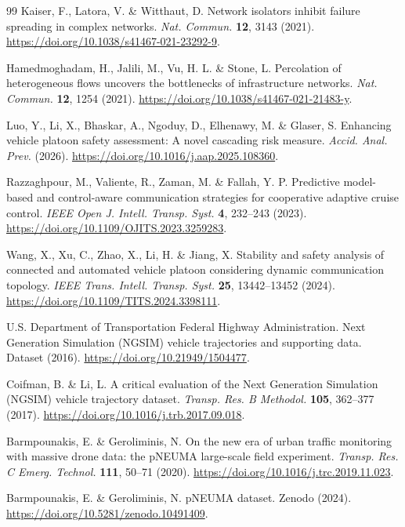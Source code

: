 \documentclass[10pt,a4paper,twocolumn]{article}
\begin{document}
\begin{thebibliography}{99}
Kaiser, F., Latora, V. \& Witthaut, D. Network isolators inhibit failure spreading in complex networks. \textit{Nat. Commun.} \textbf{12}, 3143 (2021). \url{https://doi.org/10.1038/s41467-021-23292-9}.

Hamedmoghadam, H., Jalili, M., Vu, H. L. \& Stone, L. Percolation of heterogeneous flows uncovers the bottlenecks of infrastructure networks. \textit{Nat. Commun.} \textbf{12}, 1254 (2021). \url{https://doi.org/10.1038/s41467-021-21483-y}.

Luo, Y., Li, X., Bhaskar, A., Ngoduy, D., Elhenawy, M. \& Glaser, S. Enhancing vehicle platoon safety assessment: A novel cascading risk measure. \textit{Accid. Anal. Prev.} (2026). \url{https://doi.org/10.1016/j.aap.2025.108360}.

Razzaghpour, M., Valiente, R., Zaman, M. \& Fallah, Y. P. Predictive model-based and control-aware communication strategies for cooperative adaptive cruise control. \textit{IEEE Open J. Intell. Transp. Syst.} \textbf{4}, 232--243 (2023). \url{https://doi.org/10.1109/OJITS.2023.3259283}.

Wang, X., Xu, C., Zhao, X., Li, H. \& Jiang, X. Stability and safety analysis of connected and automated vehicle platoon considering dynamic communication topology. \textit{IEEE Trans. Intell. Transp. Syst.} \textbf{25}, 13442--13452 (2024). \url{https://doi.org/10.1109/TITS.2024.3398111}.

U.S. Department of Transportation Federal Highway Administration. Next Generation Simulation (NGSIM) vehicle trajectories and supporting data. Dataset (2016). \url{https://doi.org/10.21949/1504477}.

Coifman, B. \& Li, L. A critical evaluation of the Next Generation Simulation (NGSIM) vehicle trajectory dataset. \textit{Transp. Res. B Methodol.} \textbf{105}, 362--377 (2017). \url{https://doi.org/10.1016/j.trb.2017.09.018}.

Barmpounakis, E. \& Geroliminis, N. On the new era of urban traffic monitoring with massive drone data: the pNEUMA large-scale field experiment. \textit{Transp. Res. C Emerg. Technol.} \textbf{111}, 50--71 (2020). \url{https://doi.org/10.1016/j.trc.2019.11.023}.

Barmpounakis, E. \& Geroliminis, N. pNEUMA dataset. Zenodo (2024). \url{https://doi.org/10.5281/zenodo.10491409}.


\end{thebibliography}
\end{document}

